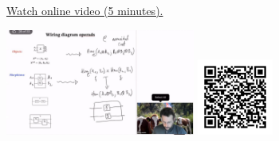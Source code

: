 
\begin{minipage}{10cm}
    \href{https://act4e-spring21.netlify.app/videos/spring2021-operads-b:wiring-diags-operads.html}{Watch online video (5 minutes).}
        
    \href{https://act4e-spring21.netlify.app/videos/spring2021-operads-b:wiring-diags-operads.html}{\includegraphics[height=3.5cm]{spring2021-operads-b:wiring-diags-operads/thumbnails.jpg}}
    \href{https://act4e-spring21.netlify.app/videos/spring2021-operads-b:wiring-diags-operads.html}{\includegraphics[height=2.5cm]{spring2021-operads-b:wiring-diags-operads/qrcode.png}}
\end{minipage}
